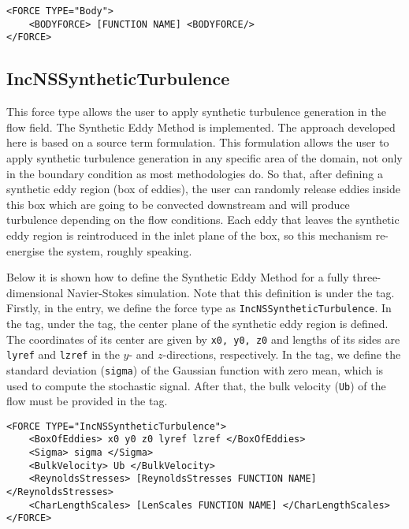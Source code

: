 \begin{lstlisting}[style=XMLStyle] 
<FORCE TYPE="Body">
    <BODYFORCE> [FUNCTION NAME] <BODYFORCE/>
</FORCE>
\end{lstlisting}

\subsection{IncNSSyntheticTurbulence}
This force type allows the user to apply synthetic turbulence generation in the flow field. The Synthetic Eddy Method is implemented. The approach developed here is based on a source term formulation. This formulation allows the user to apply synthetic turbulence generation in any specific area of the domain, not only in the boundary condition as most methodologies do. So that, after defining a synthetic eddy region (box of eddies), the user can randomly release eddies inside this box which are going to be convected downstream and will produce turbulence depending on the flow conditions. Each eddy  that leaves the synthetic eddy region is reintroduced in the inlet plane of the box, so this mechanism re-energise the system, roughly speaking. 

Below it is shown how to define the Synthetic Eddy Method for a fully three-dimensional Navier-Stokes simulation. Note that this definition is under the  tag. Firstly, in the  entry, we define the force type as \texttt{IncNSSyntheticTurbulence}. In the  tag, under the  tag, the center plane of the synthetic eddy region is defined. The coordinates of its center are given by \texttt{x0, y0, z0} and lengths of its sides are \texttt{lyref}  and \texttt{lzref} in the $y$- and $z$-directions, respectively. In the  tag, we define the standard deviation (\texttt{sigma}) of the Gaussian function with zero mean, which is used to compute the stochastic signal. After that, the bulk velocity (\texttt{Ub}) of the flow must be provided in the  tag. 

\begin{lstlisting}[style=XMLStyle] 
<FORCE TYPE="IncNSSyntheticTurbulence">
    <BoxOfEddies> x0 y0 z0 lyref lzref </BoxOfEddies>
    <Sigma> sigma </Sigma>
    <BulkVelocity> Ub </BulkVelocity>
    <ReynoldsStresses> [ReynoldsStresses FUNCTION NAME] </ReynoldsStresses>
    <CharLengthScales> [LenScales FUNCTION NAME] </CharLengthScales>
</FORCE>
\end{lstlisting}

